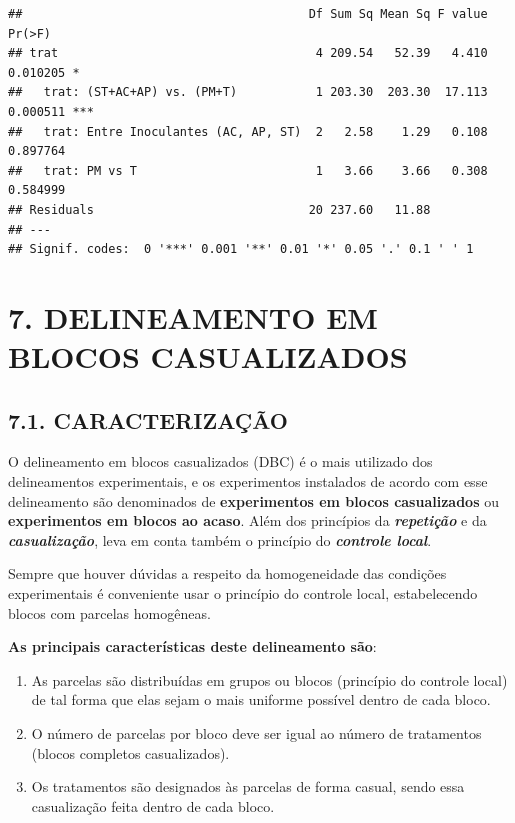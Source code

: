 \documentclass[
]{book}
\begin{document}
\begin{verbatim}
##                                        Df Sum Sq Mean Sq F value   Pr(>F)    
## trat                                    4 209.54   52.39   4.410 0.010205 *  
##   trat: (ST+AC+AP) vs. (PM+T)           1 203.30  203.30  17.113 0.000511 ***
##   trat: Entre Inoculantes (AC, AP, ST)  2   2.58    1.29   0.108 0.897764    
##   trat: PM vs T                         1   3.66    3.66   0.308 0.584999    
## Residuals                              20 237.60   11.88                     
## ---
## Signif. codes:  0 '***' 0.001 '**' 0.01 '*' 0.05 '.' 0.1 ' ' 1
\end{verbatim}

\hypertarget{delineamento-em-blocos-casualizados}{%
\chapter{7. DELINEAMENTO EM BLOCOS CASUALIZADOS}\label{delineamento-em-blocos-casualizados}}

\hypertarget{caracterizauxe7uxe3o}{%
\section{7.1. CARACTERIZAÇÃO}\label{caracterizauxe7uxe3o}}

O delineamento em blocos casualizados (DBC) é o mais utilizado dos delineamentos experimentais, e os experimentos instalados de acordo com esse delineamento são denominados de \textbf{experimentos em blocos casualizados} ou \textbf{experimentos em blocos ao acaso}. Além dos princípios da \textbf{\emph{repetição}} e da \textbf{\emph{casualização}}, leva em conta também o princípio do \textbf{\emph{controle local}}.

Sempre que houver dúvidas a respeito da homogeneidade das condições experimentais é conveniente usar o princípio do controle local, estabelecendo blocos com parcelas homogêneas.

\textbf{As principais características deste delineamento são}:

\begin{enumerate}
\def\labelenumi{\arabic{enumi}.}
\item
  As parcelas são distribuídas em grupos ou blocos (princípio do controle local) de tal forma que elas sejam o mais uniforme possível dentro de cada bloco.
\item
  O número de parcelas por bloco deve ser igual ao número de tratamentos (blocos completos casualizados).
\item
  Os tratamentos são designados às parcelas de forma casual, sendo essa casualização feita dentro de cada bloco.
\end{enumerate}
\end{document}
